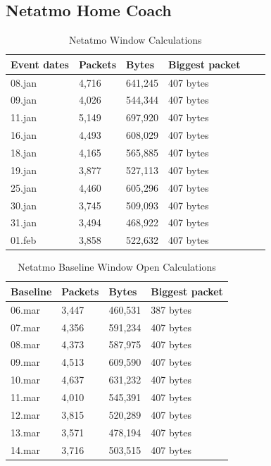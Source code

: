 \newpage
\subsection{Netatmo Home Coach}

\begin{table}[H]
    \centering
    \caption{Netatmo Window Calculations}
    \begin{tabular}{|l|l|l|l|l|l|}
    \hline
        \textbf{Event dates} & \textbf{Packets} & \textbf{Bytes} & \textbf{Biggest packet} \\ \hline
        08.jan & 4,716 & 641,245 & 407 bytes\\ \hline
        09.jan & 4,026 & 544,344 & 407 bytes \\ \hline
        11.jan & 5,149 & 697,920 & 407 bytes\\ \hline
        16.jan & 4,493 & 608,029 & 407 bytes\\ \hline
        18.jan & 4,165 & 565,885 & 407 bytes\\ \hline
        19.jan & 3,877 & 527,113 & 407 bytes \\ \hline
        25.jan & 4,460 & 605,296 & 407 bytes \\ \hline
        30.jan & 3,745 & 509,093 & 407 bytes \\ \hline
        31.jan & 3,494 & 468,922 & 407 bytes \\ \hline
        01.feb & 3,858 & 522,632 & 407 bytes \\ \hline
    \end{tabular}
    \label{tab:NetatmoWindowCalculations}
\end{table}

\begin{table}[H]
    \centering
    \caption{Netatmo Baseline Window Open Calculations}
    \begin{tabular}{|l|l|l|l|}
    \hline
        \textbf{Baseline} & \textbf{Packets} & \textbf{Bytes} & \textbf{Biggest packet} \\ \hline
        06.mar & 3,447 & 460,531 & 387 bytes\\ \hline
        07.mar & 4,356 & 591,234 & 407 bytes\\ \hline
        08.mar & 4,373 & 587,975 & 407 bytes \\ \hline
        09.mar & 4,513 & 609,590 & 407 bytes \\ \hline
        10.mar & 4,637 & 631,232 & 407 bytes \\ \hline
        11.mar & 4,010 & 545,391 & 407 bytes \\ \hline
        12.mar & 3,815 & 520,289 & 407 bytes \\ \hline
        13.mar & 3,571 & 478,194 & 407 bytes \\ \hline
        14.mar & 3,716 & 503,515 & 407 bytes \\ \hline
    \end{tabular}
    \label{tab:NetatmoBaselineWindowCalculations}
\end{table}

